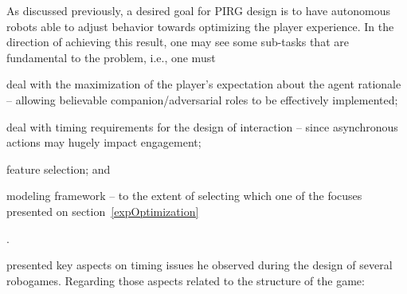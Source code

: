 As discussed previously, a desired goal for PIRG design is to have autonomous robots able to adjust behavior towards optimizing the player experience. In the direction of achieving this result, one may see some sub-tasks that are fundamental to the problem, i.e., one must \begin{inparaenum}\item deal with the maximization of the player's expectation about the agent rationale -- allowing believable companion/adversarial roles to be effectively implemented; \item deal with timing requirements for the design of interaction -- since asynchronous actions may hugely impact engagement; \item feature selection; and \item modeling framework -- to the extent of selecting which one of the focuses presented on section~\ref{expOptimization}\end{inparaenum}.

\cite{Bonarini2014} presented key aspects on timing issues he observed during the design of several robogames. Regarding those aspects related to the structure of the game:

